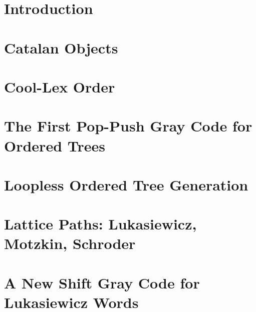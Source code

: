 


\maketitle
\tableofcontents




\chapter{Introduction}

\chapter{Catalan Objects} \label{chap:catalan}

\chapter{Cool-Lex Order}\label{chap:cool}


\chapter{The First Pop-Push Gray Code for Ordered Trees} \label{chap:otree-graycode}

\chapter{Loopless Ordered Tree Generation} \label{chap:otree-implementation}



\chapter{Lattice Paths: Lukasiewicz, Motzkin, Schroder}
 \label{chap:luka-background}

\chapter{A New Shift Gray Code for Lukasiewicz Words} \label{chap:luka-graycode}

